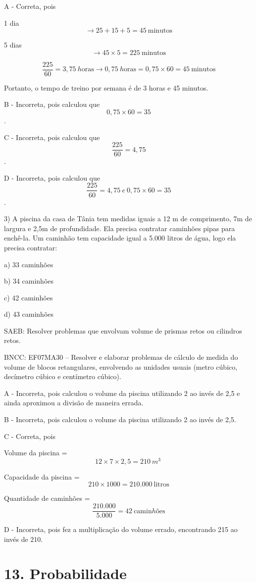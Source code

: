 A - Correta, pois

1 dia \[\rightarrow 25 + 15 + 5 = 45\ \text{minutos}\]

5 dias \[\rightarrow 45 \times 5 = 225\ \text{minutos}\]

\[\frac{225}{60} = 3,75\ h\text{oras} \rightarrow 0,75\ h\text{oras} = 0,75 \times 60 = 45\ \text{minutos}\]

Portanto, o tempo de treino por semana é de 3 horas e 45 minutos.

B - Incorreta, pois calculou que \[0,75 \times 60 = 35\].

C - Incorreta, pois calculou que \[\frac{225}{60} = 4,75\].

D - Incorreta, pois calculou que
\[\frac{225}{60} = 4,75\ e\ 0,75 \times 60 = 35\].

3) A piscina da casa de Tânia tem medidas iguais a 12 m de comprimento,
7m de largura e 2,5m de profundidade. Ela precisa contratar caminhões
pipas para enchê-la. Um caminhão tem capacidade igual a 5.000 litros de
água, logo ela precisa contratar:

a) 33 caminhões

b) 34 caminhões

c) 42 caminhões

d) 43 caminhões

SAEB: Resolver problemas que envolvam volume de prismas retos ou
cilindros retos.

BNCC: EF07MA30 -- Resolver e elaborar problemas de cálculo de medida do
volume de blocos retangulares, envolvendo as unidades usuais (metro
cúbico, decímetro cúbico e centímetro cúbico).

A - Incorreta, pois calculou o volume da piscina utilizando 2 ao invés
de 2,5 e ainda aproximou a divisão de maneira errada.

B - Incorreta, pois calculou o volume da piscina utilizando 2 ao invés
de 2,5.

C - Correta, pois

Volume da piscina = \[12 \times 7 \times 2,5 = 210\ m^{3}\ \]

Capacidade da piscina = \[210 \times 1000 = 210.000\ \text{litros}\]

Quantidade de caminhões =
\[\frac{210.000}{5.000} = 42\ \text{camin}hõ\text{es}\]

D - Incorreta, pois fez a multiplicação do volume errado, encontrando
215 ao invés de 210.

\hypertarget{probabilidade}{%
\section{13. Probabilidade}\label{probabilidade}}

